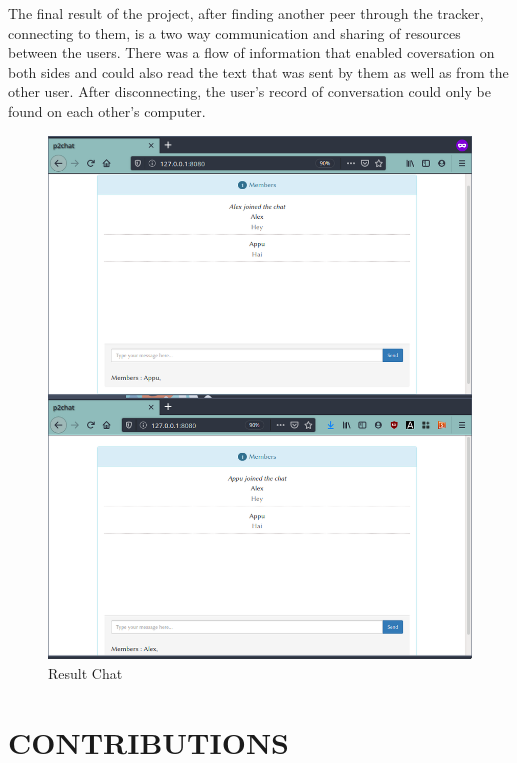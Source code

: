 \documentclass{fisatproject}
\begin{document}
The final result of the project, after finding another peer through the tracker, connecting to them, is a two way communication and sharing of resources between the users. There was a flow of information that enabled coversation on both sides and could also read the text that was sent by them as well as from the other user. After disconnecting, the user's record of conversation could only be found on each other's computer.
\newpage
	\begin{center}
	\begin{figure}[h]
		
		\includegraphics[scale=.4]{result.png}
		\caption{Result Chat}
		
	\end{figure}
\end{center}











\chapter{CONTRIBUTIONS}
\end{document}
